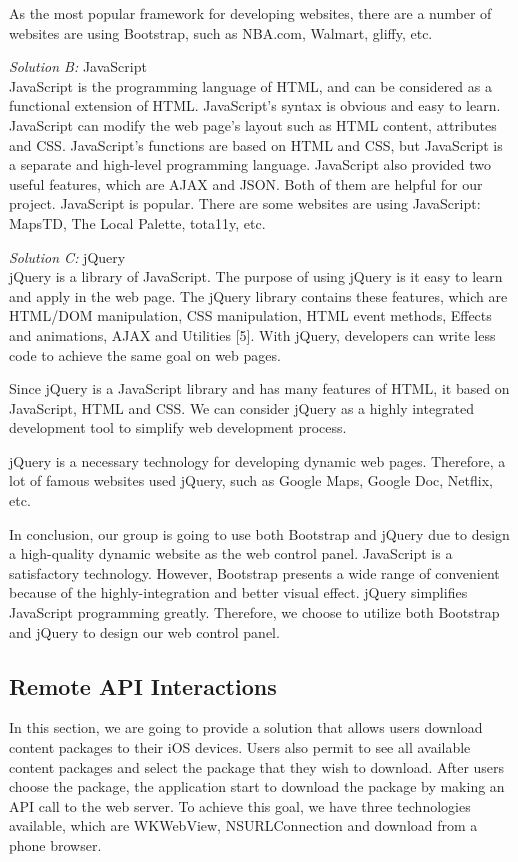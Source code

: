 \documentclass[letterpaper, 10pt,titlepage]{article}
\begin{document}
As the most popular framework for developing websites, there are a number of websites are using Bootstrap, such as NBA.com, Walmart, gliffy, etc. 


\textit{Solution B:} JavaScript\\
JavaScript is the programming language of HTML, and can be considered as a functional extension of HTML. JavaScript’s syntax is obvious and easy to learn. JavaScript can modify the web page’s layout such as HTML content, attributes and CSS. JavaScript’s functions are based on HTML and CSS, but JavaScript is a separate and high-level programming language. JavaScript also provided two useful features, which are AJAX and JSON. Both of them are helpful for our project. JavaScript is popular. There are some websites are using JavaScript: MapsTD, The Local Palette, tota11y, etc.


\textit{Solution C:} jQuery\\
jQuery is a library of JavaScript. The purpose of using jQuery is it easy to learn and apply in the web page. The jQuery library contains these features, which are HTML/DOM manipulation, CSS manipulation, HTML event methods, Effects and animations, AJAX and Utilities [5]. With jQuery, developers can write less code to achieve the same goal on web pages. 


Since jQuery is a JavaScript library and has many features of HTML, it based on JavaScript, HTML and CSS. We can consider jQuery as a highly integrated development tool to simplify web development process.


jQuery is a necessary technology for developing dynamic web pages. Therefore, a lot of famous websites used jQuery, such as Google Maps, Google Doc, Netflix, etc. 


In conclusion, our group is going to use both Bootstrap and jQuery due to design a high-quality dynamic website as the web control panel. JavaScript is a satisfactory technology. However, Bootstrap presents a wide range of convenient because of the highly-integration and better visual effect. jQuery simplifies JavaScript programming greatly. Therefore, we choose to utilize both Bootstrap and jQuery to design our web control panel.


\subsection{Remote API Interactions}
In this section, we are going to provide a solution that allows users download content packages to their iOS devices. Users also permit to see all available content packages and select the package that they wish to download. After users choose the package, the application start to download the package by making an API call to the web server. To achieve this goal, we have three technologies available, which are WKWebView, NSURLConnection and download from a phone browser.
\end{document}
